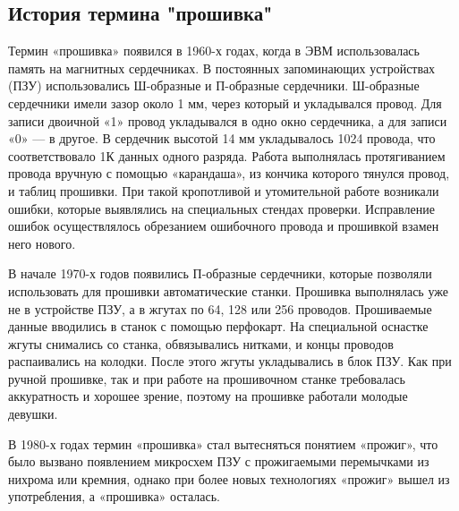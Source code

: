 \subsection{История термина "прошивка"}
Термин «прошивка» появился в 1960-х годах, когда в ЭВМ использовалась память на магнитных сердечниках. В постоянных запоминающих устройствах (ПЗУ) использовались Ш-образные и П-образные сердечники. Ш-образные сердечники имели зазор около 1 мм, через который и укладывался провод. Для записи двоичной «1» провод укладывался в одно окно сердечника, а для записи «0» — в другое. В сердечник высотой 14 мм укладывалось 1024 провода, что соответствовало 1К данных одного разряда. Работа выполнялась протягиванием провода вручную с помощью «карандаша», из кончика которого тянулся провод, и таблиц прошивки. При такой кропотливой и утомительной работе возникали ошибки, которые выявлялись на специальных стендах проверки. Исправление ошибок осуществлялось обрезанием ошибочного провода и прошивкой взамен него нового.

В начале 1970-х годов появились П-образные сердечники, которые позволяли использовать для прошивки автоматические станки. Прошивка выполнялась уже не в устройстве ПЗУ, а в жгутах по 64, 128 или 256 проводов. Прошиваемые данные вводились в станок с помощью перфокарт. На специальной оснастке жгуты снимались со станка, обвязывались нитками, и концы проводов распаивались на колодки. После этого жгуты укладывались в блок ПЗУ. Как при ручной прошивке, так и при работе на прошивочном станке требовалась аккуратность и хорошее зрение, поэтому на прошивке работали молодые девушки.

В 1980-х годах термин «прошивка» стал вытесняться понятием «прожиг», что было вызвано появлением микросхем ПЗУ с прожигаемыми перемычками из нихрома или кремния, однако при более новых технологиях «прожиг» вышел из употребления, а «прошивка» осталась.\cite{wiki:firmware}
